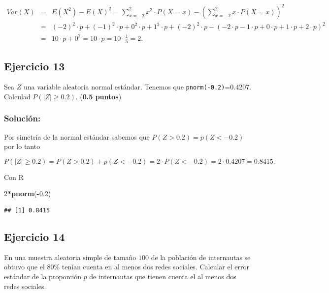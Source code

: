 \documentclass[
]{article}
\newenvironment{Shaded}{\begin{snugshade}}{\end{snugshade}}
\newcommand{\DecValTok}[1]{\textcolor[rgb]{0.00,0.00,0.81}{#1}}
\newcommand{\FloatTok}[1]{\textcolor[rgb]{0.00,0.00,0.81}{#1}}
\newcommand{\KeywordTok}[1]{\textcolor[rgb]{0.13,0.29,0.53}{\textbf{#1}}}
\newcommand{\NormalTok}[1]{#1}
\newcommand{\OperatorTok}[1]{\textcolor[rgb]{0.81,0.36,0.00}{\textbf{#1}}}
\begin{document}
\begin{eqnarray*}
Var(X)&=&E(X^2)-E(X)^2=\displaystyle\sum_{x=-2}^{2} x^2\cdot P(X=x)-\left(\displaystyle\sum_{x=-2}^2 x\cdot P(X=x)\right)^2\\
&=& (-2)^2\cdot p+(-1)^2\cdot p+0^2\cdot p+1^2\cdot p+(-2)^2\cdot p-\left(-2\cdot p -1\cdot p+0\cdot p+1\cdot p +2\cdot p\right)^2\\
&=& 10\cdot p+0^2=10\cdot p=10\cdot \frac{1}{5}=2.
\end{eqnarray*}

\hypertarget{ejercicio-13}{%
\subsection{Ejercicio 13}\label{ejercicio-13}}

Sea \(Z\) una variable aleatoria normal estándar. Tenemos que
\texttt{pnorm(-0.2)}=0.4207. Calculad \(P(|Z|\geq 0.2)\). (\textbf{0.5
puntos})

\hypertarget{soluciuxf3n-12}{%
\subsubsection{Solución:}\label{soluciuxf3n-12}}

Por simetría de la normal estándar sabemos que \(P(Z>0.2)=p(Z<-0.2)\)
por lo tanto

\[P(|Z|\geq 0.2)=P(Z>0.2)+p(Z<-0.2)=2\cdot P(Z<-0.2)=2\cdot 0.4207=
0.8415.\]

Con R

\begin{Shaded}
\begin{Highlighting}[]
\DecValTok{2}\OperatorTok{*}\KeywordTok{pnorm}\NormalTok{(}\OperatorTok{{-}}\FloatTok{0.2}\NormalTok{)}
\end{Highlighting}
\end{Shaded}

\begin{verbatim}
## [1] 0.8415
\end{verbatim}

\hypertarget{ejercicio-14}{%
\subsection{Ejercicio 14}\label{ejercicio-14}}

En una muestra aleatoria simple de tamaño \(100\) de la población de
internautas se obtuvo que el 80\% tenían cuenta en al menos dos redes
sociales. Calcular el error estándar de la proporción \(p\) de
internautas que tienen cuenta el al menos dos redes sociales.
\end{document}
